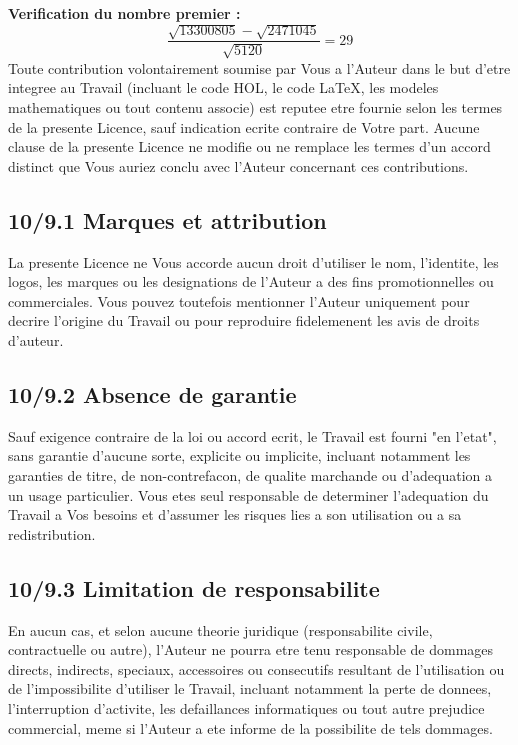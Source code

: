 \documentclass[a4paper,11pt]{article}
\begin{document}
\textbf{Verification du nombre premier :}
\[
\frac{\sqrt{13300805} - \sqrt{2471045}}{\sqrt{5120}} = 29
\]
Toute contribution volontairement soumise par Vous a l'Auteur dans le but
d'etre integree au Travail (incluant le code HOL, le code LaTeX, les
modeles mathematiques ou tout contenu associe) est reputee etre fournie
selon les termes de la presente Licence, sauf indication ecrite contraire
de Votre part. Aucune clause de la presente Licence ne modifie ou ne
remplace les termes d'un accord distinct que Vous auriez conclu avec
l'Auteur concernant ces contributions.

\subsection*{10/9.1 Marques et attribution}

La presente Licence ne Vous accorde aucun droit d'utiliser le nom,
l'identite, les logos, les marques ou les designations de l'Auteur a des
fins promotionnelles ou commerciales. Vous pouvez toutefois mentionner
l'Auteur uniquement pour decrire l'origine du Travail ou pour reproduire
fidelemenent les avis de droits d'auteur.

\subsection*{10/9.2 Absence de garantie}

Sauf exigence contraire de la loi ou accord ecrit, le Travail est fourni
"en l'etat", sans garantie d'aucune sorte, explicite ou implicite,
incluant notamment les garanties de titre, de non-contrefacon, de qualite
marchande ou d'adequation a un usage particulier. Vous etes seul
responsable de determiner l'adequation du Travail a Vos besoins et
d'assumer les risques lies a son utilisation ou a sa redistribution.

\subsection*{10/9.3 Limitation de responsabilite}

En aucun cas, et selon aucune theorie juridique (responsabilite civile,
contractuelle ou autre), l'Auteur ne pourra etre tenu responsable de
dommages directs, indirects, speciaux, accessoires ou consecutifs
resultant de l'utilisation ou de l'impossibilite d'utiliser le Travail,
incluant notamment la perte de donnees, l'interruption d'activite, les
defaillances informatiques ou tout autre prejudice commercial, meme si
l'Auteur a ete informe de la possibilite de tels dommages.
\end{document}

